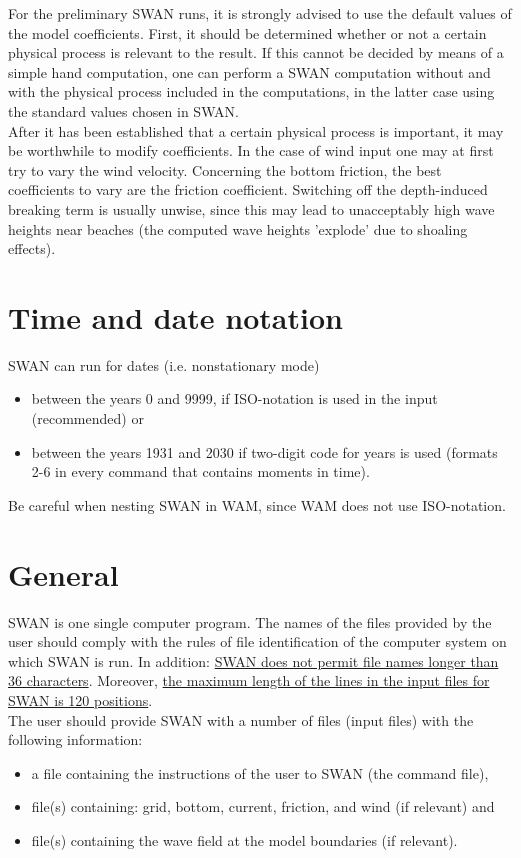 \documentclass[12pt]{book}
\begin{document}
For the preliminary SWAN runs, it is strongly advised to use the default values of the model coefficients. First, it
should be determined whether or not a certain physical process is relevant to the result. If this cannot be
decided by means of a simple hand computation, one can perform a SWAN computation without and with
the physical process included in the computations, in the latter case using the standard values chosen
in SWAN.
\\[2ex]
\noindent
After it has been established that a certain physical process is important, it may be worthwhile to modify
coefficients. In the case of wind input one may at first try to vary the wind velocity. Concerning the bottom
friction, the best coefficients to vary are the friction coefficient. Switching off the depth-induced breaking
term is usually unwise, since this may lead to unacceptably high wave heights near beaches (the
computed wave heights 'explode' due to shoaling effects).

\section{Time and date notation}
SWAN can run for dates (i.e. nonstationary mode)
\begin{itemize}
  \item between the years 0 and 9999, if ISO-notation is used in the input (recommended) or
  \item between the years 1931 and 2030 if two-digit code for years is used (formats 2-6 in every
        command that contains moments in time).
\end{itemize}
Be careful when nesting SWAN in WAM, since WAM does not use ISO-notation.

 \label{ch:inout}

\section{General}

SWAN is one single computer program. The names of the files provided by the user should comply with
the rules of file identification of the computer system on which SWAN is run. In addition: \underline{SWAN does not
permit file names longer than 36 characters}. Moreover, \underline{the maximum length of the lines in the input files
for SWAN is 120 positions}.
\\[2ex]
\noindent
The user should provide SWAN with a number of files (input files) with the following information:
\begin{itemize}
  \item a file containing the instructions of the user to SWAN (the command file),
  \item file(s) containing: grid, bottom, current, friction, and wind (if relevant) and
  \item file(s) containing the wave field at the model boundaries (if relevant).
\end{itemize}
\end{document}
